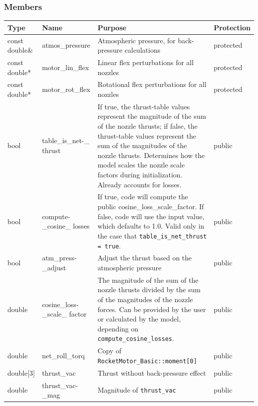 \documentclass[11pt,fleqn]{report}
\begin{document}
\subsubsection{Members}
\begin{center}
\begin{longtable}{|p{2.75cm}|p{2.8cm}|p{7.1cm}|l|} \hline
\textbf{Type} & \textbf{Name} & \textbf{Purpose} & \textbf{Protection} \\
\hline
\endhead
const double\& & atmos\_pressure & Atmospheric pressure, for back-pressure calculations & protected \\
\hline
const double* & motor\_lin\_flex & Linear flex perturbations for all nozzles & protected \\
\hline
const double* & motor\_rot\_flex & Rotational flex perturbations for all nozzles & protected \\
\hline
bool & table\_is\_net-\newline \_ thrust & If true, the thrust-table values represent the magnitude of the sum of the nozzle thrusts; if false, the thrust-table values represent the sum of the magnitudes of the nozzle thrusts. Determines how the model scales the nozzle scale factors during initialization. Already accounts for losses. & public \\
\hline
bool & compute-\newline \_cosine\_ losses & If true, code will compute the public cosine\_loss\_scale\_factor. If false, code will use the input value, which defaults to 1.0. Valid only in the case that \newline \verb|table_is_net_thrust = true|. & public \\
\hline
bool & atm\_press-\newline \_adjust & Adjust the thrust based on the atmospheric pressure & public \\
\hline
double & cosine\_loss-\newline \_scale\_ factor & The magnitude of the sum of the nozzle thrusts divided by the sum of the magnitudes of the nozzle forces. Can be provided by the user or calculated by the model, depending on \verb|compute_cosine_losses|. & public \\
\hline
double & net\_roll\_torq & Copy of \verb|RocketMotor_Basic::moment[0]| & public \\
\hline
double[3] & thrust\_vac & Thrust without back-pressure effect & public \\
\hline
double & thrust\_vac-\newline \_mag & Magnitude of \verb|thrust_vac| & public \\

\end{longtable}
\end{center}
\end{document}
